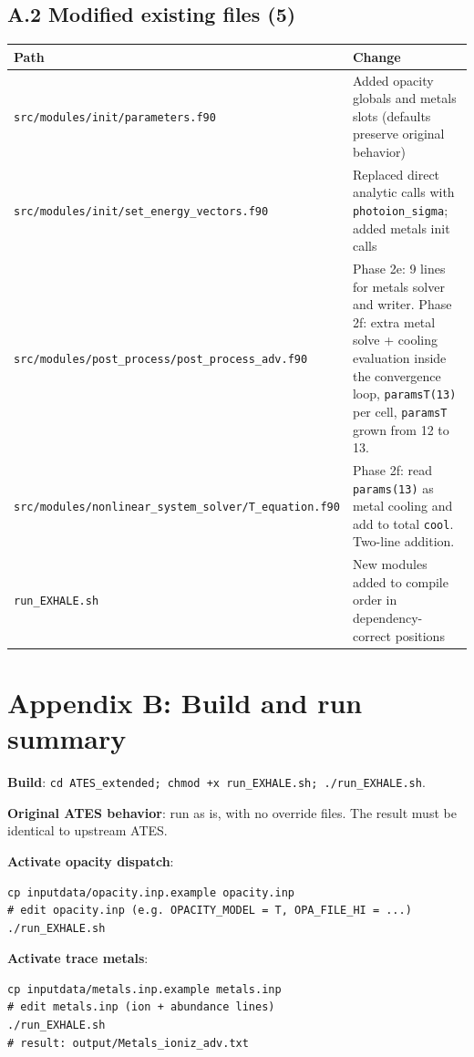 \documentclass[english,a4paper]{my_memo}
\begin{document}
\subsection*{A.2 Modified existing files (5)}

\begin{center}
\begin{tabular}{|l|p{8cm}|}
\hline
Path & Change \\
\hline
\texttt{src/modules/init/parameters.f90}
   & Added opacity globals and metals slots
     (defaults preserve original behavior) \\
\texttt{src/modules/init/set\_energy\_vectors.f90}
   & Replaced direct analytic calls with \texttt{photoion\_sigma};
     added metals init calls \\
\texttt{src/modules/post\_process/post\_process\_adv.f90}
   & Phase 2e: 9 lines for metals solver and writer.
     Phase 2f: extra metal solve + cooling evaluation inside
     the convergence loop, \texttt{paramsT(13)} per cell,
     \texttt{paramsT} grown from 12 to 13. \\
\texttt{src/modules/nonlinear\_system\_solver/T\_equation.f90}
   & Phase 2f: read \texttt{params(13)} as metal cooling and add to
     total \texttt{cool}. Two-line addition. \\
\texttt{run\_EXHALE.sh}
   & New modules added to compile order in dependency-correct positions \\
\hline
\end{tabular}
\end{center}

\section*{Appendix B: Build and run summary}

\textbf{Build}:
\texttt{cd ATES\_extended; chmod +x run\_EXHALE.sh; ./run\_EXHALE.sh}.

\textbf{Original ATES behavior}: run as is, with no override files. The
result must be identical to upstream ATES.

\textbf{Activate opacity dispatch}:
\begin{verbatim}
cp inputdata/opacity.inp.example opacity.inp
# edit opacity.inp (e.g. OPACITY_MODEL = T, OPA_FILE_HI = ...)
./run_EXHALE.sh
\end{verbatim}

\textbf{Activate trace metals}:
\begin{verbatim}
cp inputdata/metals.inp.example metals.inp
# edit metals.inp (ion + abundance lines)
./run_EXHALE.sh
# result: output/Metals_ioniz_adv.txt
\end{verbatim}
\end{document}

